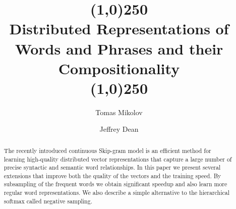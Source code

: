 \documentclass[12pt, a4paper]{article}
\begin{document}
\title{\line(1,0){250} \\ \textbf{Distributed Representations of Words and Phrases and their Compositionality} \\  \line(1,0){250}}
\author{Tomas Mikolov}
\author{Jeffrey Dean}
\date{}
\maketitle


\begin{abstract}
The recently introduced continuous Skip-gram model is an efficient method for learning high-quality distributed vector representations that capture a large number of precise syntactic and semantic word relationships. In this paper we present several extensions that improve both the quality of the vectors and the training speed. By subsampling of the frequent words we obtain significant speedup and also learn more regular word representations. We also describe a simple alternative to the hierarchical softmax called negative sampling. 
\end{abstract}
\end{document}
